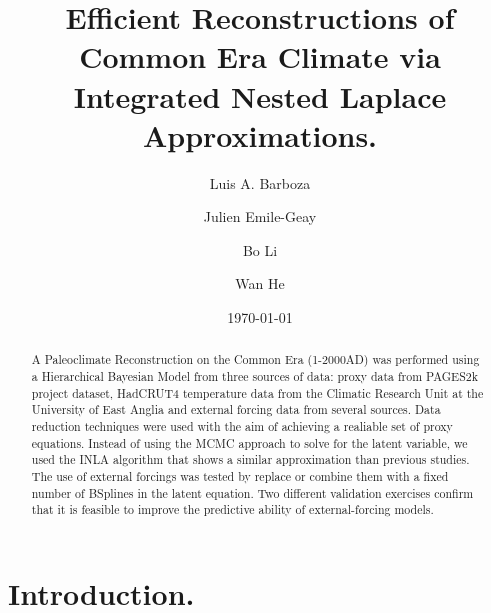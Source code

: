 \documentclass[12pt]{amsart}
\theoremstyle{plain}
\theoremstyle{definition}
\theoremstyle{remark}
\begin{document}
\doublespacing
\title[]{Efficient Reconstructions of Common Era Climate via Integrated Nested Laplace Approximations.}

\author[]{Luis A. Barboza}
\address{Centro de Investigacion en Matematica Pura y Aplicada (CIMPA)-Escuela
  de Matematica, Universidad de Costa Rica\\
San Jos\'e, Costa Rica}


\author[]{Julien Emile-Geay}
\address{Department of Earth Sciences \\
  University of Southern California \\
  Los Angeles, California, USA.
}


\author[]{Bo Li}
\address{Department of Statistics \\
  University of Illinois at Urbana-Champaign \\
  Champaign, Illinois, USA.
}

\author[]{Wan He}

\date{\today}
\subjclass[2010]{}
\maketitle

\begin{abstract}
A Paleoclimate Reconstruction on the Common Era (1-2000AD) was performed using a
Hierarchical Bayesian Model from three sources of data: proxy data from PAGES2k
project dataset, HadCRUT4 temperature data from the Climatic Research Unit
at the University of East Anglia and external forcing data from several sources.
Data reduction techniques were used with the aim of achieving a realiable set of
proxy equations. Instead of using the MCMC approach to solve for the latent variable, we used the
INLA algorithm that shows a similar approximation than previous studies. The use
of external forcings was tested by replace or combine them with a fixed number of
BSplines in the latent equation. Two different validation exercises confirm that
it is feasible to improve the predictive ability of external-forcing models. 
\end{abstract}

\section{Introduction.}
\label{sec:intro}
\end{document}
